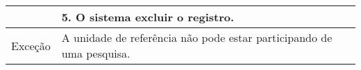 \begin{table}[!h]
\begin{tabular}{|l|l|}
                                                         & 5. O sistema excluir o registro.                                                                                                                                                                                                                                                                                                                                                         \\ \hline
Exceção                                                  & A unidade de referência não pode estar participando de uma pesquisa.                                                                                                                                                                                                                                                                                                                     \\ \hline
                                                         \end{tabular}
\end{table}

